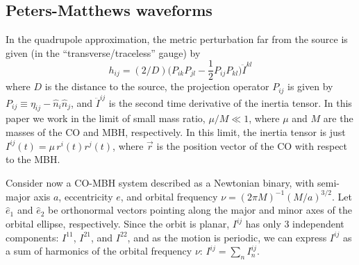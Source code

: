 \documentclass[11pt]{report}
\def\be{\begin{equation}}
\def\ee{\end{equation}}
\begin{document}
\subsection{Peters-Matthews waveforms}

In the quadrupole approximation, the metric perturbation
far from the source is given (in the ``transverse/traceless''
gauge) by \cite{MTW}
\be\label{quad}
h_{ij} = (2/D)\bigl(P_{ik}P_{jl} -
\frac{1}{2}P_{ij}P_{kl}\bigr) \ddot I^{kl}
\ee
where %
$D$ is the distance to the source, the projection operator $P_{ij}$ is
given by
$P_{ij} \equiv \eta_{ij} - {\hat n}_i{\hat n}_j$, and
$\ddot I^{ij}$ is the second time derivative of the inertia tensor.
In this paper we work in the limit of small mass ratio, $\mu/M\ll 1$,
where $\mu$ and $M$ are the masses of the CO and MBH, respectively.
In this limit, the inertia tensor is just
$I^{ij}(t) = \mu\, r^i(t) r^j(t)$,
where $\vec r$ is the position vector of the CO with respect to the MBH.

Consider now a CO-MBH system described as a Newtonian binary, with semi-major
axis $a$, eccentricity $e$, and orbital frequency $\nu = (2\pi M)^{-1}
(M/a)^{3/2}$.
Let ${\hat e_1}$ and ${\hat e_2}$ be orthonormal vectors pointing
along the major and minor axes of the orbital ellipse, respectively.
Since the orbit is planar, $I^{ij}$ has only 3 independent components:
$I^{11}$, $I^{21}$, and $I^{22}$,
and as the motion is periodic, we can express $I^{ij}$ as a sum of harmonics
of the orbital frequency $\nu$:
$I^{ij}=\sum_n I^{ij}_n$.
\end{document}
